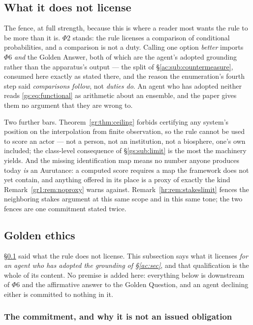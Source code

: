 \documentclass[11pt]{article}
\numberwithin{equation}{section}
\theoremstyle{plain}
\theoremstyle{definition}
\theoremstyle{remark}
\begin{document}
\subsection{What it does not license}\label{gs:sub:fence}

The fence, at full strength, because this is where a reader most wants the rule to be more than it is. $\Phi2$ stands: the rule licenses a comparison of conditional probabilities, and a comparison is not a duty. Calling one option \emph{better} imports $\Phi6$ \emph{and} the Golden Answer, both of which are the agent's adopted grounding rather than the apparatus's output --- the split of \S\ref{ac:sub:countermeasure}, consumed here exactly as stated there, and the reason the enumeration's fourth step said \emph{comparisons follow}, not \emph{duties do}. An agent who has adopted neither reads \eqref{gs:eq:functional} as arithmetic about an ensemble, and the paper gives them no argument that they are wrong to.

Two further bars. Theorem~\ref{gr:thm:ceiling} forbids certifying any system's position on the interpolation from finite observation, so the rule cannot be used to score an actor --- not a person, not an institution, not a biosphere, one's own included; the class-level consequence of \S\ref{gs:sub:limit} is the most the machinery yields. And the missing identification map means no number anyone produces today \emph{is} an Aurutance: a computed score requires a map the framework does not yet contain, and anything offered in its place is a proxy of exactly the kind Remark~\ref{gr1:rem:noproxy} warns against. Remark~\ref{hr:rem:stakeslimit} fences the neighboring stakes argument at this same scope and in this same tone; the two fences are one commitment stated twice.

\subsection{Golden ethics}\label{gs:sub:ethics}

\S\ref{gs:sub:fence} said what the rule does not license. This subsection
says what it licenses \emph{for an agent who has adopted the grounding of
\S\ref{ac:sec}}, and that qualification is the whole of its content. No
premise is added here: everything below is downstream of $\Phi6$ and the
affirmative answer to the Golden Question, and an agent declining either
is committed to nothing in it.

\subsubsection{The commitment, and why it is not an issued obligation}
\label{gs:ssub:commitment}
\end{document}
